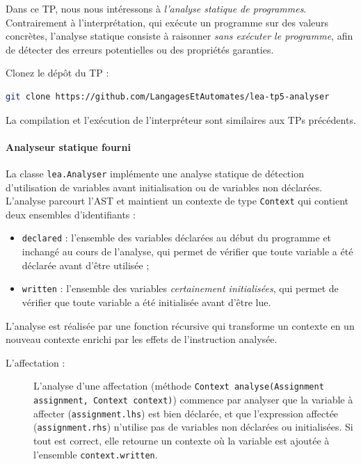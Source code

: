 \documentclass{td}
\begin{document}



Dans ce TP, nous nous intéressons à \emph{l'analyse statique de programmes}.
Contrairement à l'interprétation, qui exécute un programme sur des valeurs concrètes,
l'analyse statique consiste à raisonner \emph{sans exécuter le programme},
afin de détecter des erreurs potentielles ou des propriétés garanties.

\begin{exercice}

  \begin{questions}
  \item Clonez le dépôt du TP :
    \begin{lstlisting}[gobble=6, language=bash]
      git clone https://github.com/LangagesEtAutomates/lea-tp5-analyser
    \end{lstlisting}

    La compilation et l'exécution de l'interpréteur sont similaires aux TPs précédents.
  \end{questions}

  \paragraph{Analyseur statique fourni}
  
  La classe \lstinline{lea.Analyser} implémente une analyse statique de détection d'utilisation de variables avant initialisation ou de variables non déclarées.
  L'analyse parcourt l'AST et maintient un contexte de type \lstinline{Context} qui contient deux ensembles d'identifiants :
  \begin{itemize}
  \item \lstinline{declared} :
    l'ensemble des variables déclarées au début du programme et inchangé au cours de l'analyse,
    qui permet de vérifier que toute variable a été déclarée avant d'être utilisée ;
  \item \lstinline{written} :
    l'ensemble des variables \emph{certainement initialisées},
    qui permet de vérifier que toute variable a été initialisée avant d'être lue.
  \end{itemize}
  
  L'analyse est réalisée par une fonction récursive qui transforme un contexte en un
  nouveau contexte enrichi par les effets de l'instruction analysée. 
  \begin{description}
  \item[L'affectation :]
    L'analyse d'une affectation (méthode \lstinline{Context analyse(Assignment assignment, Context context)})
    commence par analyser que la variable à affecter (\lstinline{assignment.lhs}) est bien déclarée,
    et que l'expression affectée (\lstinline{assignment.rhs}) n'utilise pas de variables non déclarées ou initialisées.
    Si tout est correct, elle retourne un contexte où la variable est ajoutée à l'ensemble \lstinline{context.written}.
    

\end{description}
\end{exercice}
\end{document}
